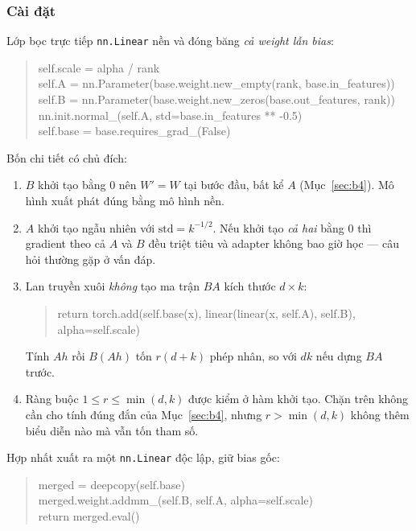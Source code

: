 \subsubsection{Cài đặt}

Lớp bọc trực tiếp \texttt{nn.Linear} nền và đóng băng \emph{cả weight lẫn bias}:

\begin{quote}\small\ttfamily
self.scale = alpha / rank\\
self.A = nn.Parameter(base.weight.new\_empty(rank, base.in\_features))\\
self.B = nn.Parameter(base.weight.new\_zeros(base.out\_features, rank))\\
nn.init.normal\_(self.A, std=base.in\_features ** -0.5)\\
self.base = base.requires\_grad\_(False)
\end{quote}

Bốn chi tiết có chủ đích:

\begin{enumerate}[leftmargin=2em]
\item $B$ khởi tạo bằng $0$ nên $W'=W$ tại bước đầu, bất kể $A$
(Mục~\ref{sec:b4}). Mô hình xuất phát đúng bằng mô hình nền.
\item $A$ khởi tạo ngẫu nhiên với $\mathrm{std}=k^{-1/2}$. Nếu khởi tạo \emph{cả
hai} bằng $0$ thì gradient theo cả $A$ và $B$ đều triệt tiêu và adapter không bao
giờ học --- câu hỏi thường gặp ở vấn đáp.
\item Lan truyền xuôi \emph{không} tạo ma trận $BA$ kích thước $d\times k$:
\begin{quote}\small\ttfamily
return torch.add(self.base(x), linear(linear(x, self.A), self.B), alpha=self.scale)
\end{quote}
Tính $Ah$ rồi $B(Ah)$ tốn $r(d+k)$ phép nhân, so với $dk$ nếu dựng $BA$ trước.
\item Ràng buộc $1\le r\le\min(d,k)$ được kiểm ở hàm khởi tạo. Chặn trên không cần
cho tính đúng đắn của Mục~\ref{sec:b4}, nhưng $r>\min(d,k)$ không thêm biểu diễn
nào mà vẫn tốn tham số.
\end{enumerate}

Hợp nhất xuất ra một \texttt{nn.Linear} độc lập, giữ bias gốc:

\begin{quote}\small\ttfamily
merged = deepcopy(self.base)\\
merged.weight.addmm\_(self.B, self.A, alpha=self.scale)\\
return merged.eval()
\end{quote}

